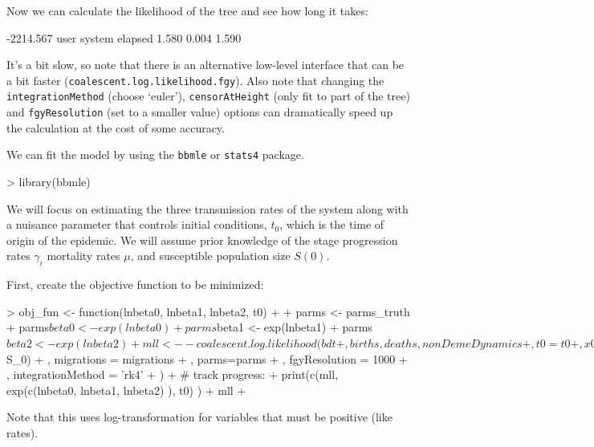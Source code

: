 \documentclass{article}
\begin{document}
Now we can calculate the likelihood of the tree and see how long it takes:
\begin{Schunk}
\begin{Soutput}
[1] -2214.567
   user  system elapsed 
  1.580   0.004   1.590 
\end{Soutput}
\end{Schunk}
It's a bit slow, so note that there is an alternative low-level interface that can be a bit faster (\texttt{coalescent.log.likelihood.fgy}). Also note that changing the \texttt{integrationMethod} (choose `euler'), \texttt{censorAtHeight} (only fit to part of the tree) and \texttt{fgyResolution} (set to a smaller value) options can dramatically speed up the calculation at the cost of some accuracy. 

We can fit the model by using the \texttt{bbmle} or \texttt{stats4} package. 
\begin{Schunk}
\begin{Sinput}
> library(bbmle)
\end{Sinput}
\end{Schunk}
We will focus on estimating the three transmission rates of the system along with a nuisance parameter that controls initial conditions, $t_0$, which is the time of origin of the epidemic. We will assume prior knowledge of the stage progression rates $\gamma_i$ mortality rates $\mu$, and susceptible population size $S(0)$.


First, create the objective function to be minimized:
\begin{Schunk}
\begin{Sinput}
> obj_fun <- function(lnbeta0, lnbeta1, lnbeta2, t0)
+ {
+ 	parms <- parms_truth
+ 	parms$beta0 <- exp(lnbeta0)
+ 	parms$beta1 <- exp(lnbeta1)
+ 	parms$beta2 <- exp(lnbeta2)
+ 	mll <- -coalescent.log.likelihood( bdt
+ 		 , births, deaths, nonDemeDynamics
+ 		 , t0 = t0
+ 		 , x0=c(I0=1, I1=.01, I2=.01, S = parms$S_0)
+ 		 , migrations = migrations
+ 		 , parms=parms
+ 		 , fgyResolution = 1000
+ 		 , integrationMethod = 'rk4'
+ 	)
+ 	# track progress: 
+ 	print(c(mll, exp(c(lnbeta0, lnbeta1, lnbeta2) ), t0) )
+ 	mll
+ }
\end{Sinput}
\end{Schunk}
Note that this uses log-transformation for variables that must be positive (like rates).
\end{document}
